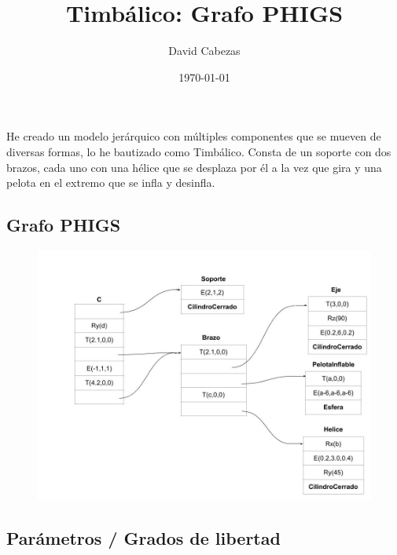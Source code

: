 \documentclass[12pt]{article}
\begin{document}
\title{Timbálico: Grafo PHIGS}
\author{David Cabezas}
\date{\today}
\maketitle

He creado un modelo jerárquico con múltiples componentes que se mueven
de diversas formas, lo he bautizado como Timbálico. Consta de un
soporte con dos brazos, cada uno con una hélice que se desplaza por él
a la vez que gira y una pelota en el extremo que se infla y desinfla.

\subsection*{Grafo PHIGS}
\vspace{-5mm}

\begin{figure}[H]
 \hspace{-30mm} \includegraphics[width=200mm]{PHIGS-timbalico}
\end{figure}

\subsection*{Parámetros / Grados de libertad}
\end{document}
